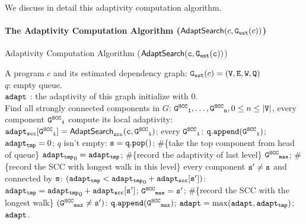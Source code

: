 We discuss in detail this adaptivity computation algorithm.
\paragraph*{The Adaptivity Computation Algorithm ($\mathsf{AdaptSearch}(c, \mathtt{{G_{est}}}(c))$)}
\begin{algorithm}
 \caption{
 {Adaptivity Computation Algorithm ({$\mathtt{\mathsf{AdaptSearch}(c, \mathtt{{G_{est}}}(c))}$})}
 }
 \label{alg:adapt}
 \begin{algorithmic}[1]
 \REQUIRE A program $c$ and
 its estimated dependency graph: $\mathtt{{G_{est}}}(c) = (\mathtt{V}, \mathtt{E}, \mathtt{W}, \mathtt{Q})$
 \\
 $q$: empty queue.
 \\
 $\mathtt{adapt}$ : the adaptivity of this graph initialize with $0$.
 \\
 \STATE Find all strongly connected components in $G$: $\mathtt{\mathtt{G^{SCC}}_1}, \ldots, \mathtt{\mathtt{G^{SCC}}_n}, 0 \leq n \leq |\mathtt{V}|$, 
  every component $\mathtt{\mathtt{G^{SCC}}_i}$ compute its local adaptivity:
 \STATE \quad $\mathtt{adapt_{scc}[\mathtt{G^{SCC}}_i] = \mathsf{AdaptSearch}_{scc}(c, \mathtt{G^{SCC}}_i)}$;
  every $\mathtt{\mathtt{G^{SCC}}_i}$:
 \STATE \qquad $\mathtt{q.append(\mathtt{G^{SCC}}_i)}$;
 \STATE \qquad $\mathtt{adapt_{tmp}} = 0$;
 \STATE {} $q$ isn't empty:
 \STATE \qquad \qquad $\mathtt{s = q.pop()}$; \#\{take the top component from head of queue\}
 \STATE \qquad \qquad $\mathtt{adapt_{tmp}}_0= \mathtt{adapt_{tmp}}$; \#\{record the adaptivity of last level\}
 \STATE \qquad \qquad $\mathtt{\mathtt{G^{SCC}}_{max}}$; \#\{record the SCC with longest walk in this level\}
 \STATE \qquad {} every component $\mathtt{s'\neq s}$ and connected by $\mathtt{s}$:
 \STATE \qquad \qquad {} $(\mathtt{adapt_{tmp}} < \mathtt{adapt_{tmp}}_0 + \mathtt{adapt_{scc}[s']})$:
 \STATE \qquad \qquad \qquad \qquad $\mathtt{adapt_{tmp}} = \mathtt{adapt_{tmp}}_0 + \mathtt{adapt_{scc}[s']}$; 
 \STATE \qquad \qquad \qquad \qquad $\mathtt{\mathtt{G^{SCC}}_{max} = s'} $; 
 \#\{record the SCC with the longest walk\} 
 \STATE \qquad \qquad {} $(\mathtt{\mathtt{G^{SCC}}_{max}\neq s'})$:
 \STATE \qquad \qquad \qquad \qquad $\mathtt{q.append(\mathtt{G^{SCC}}_{max})}$;
 \STATE \qquad $\mathtt{adapt} = \max(\mathtt{adapt}, \mathtt{adapt_{tmp}})$; 
 \RETURN $\mathtt{adapt}$.
 \end{algorithmic}
 \end{algorithm}
